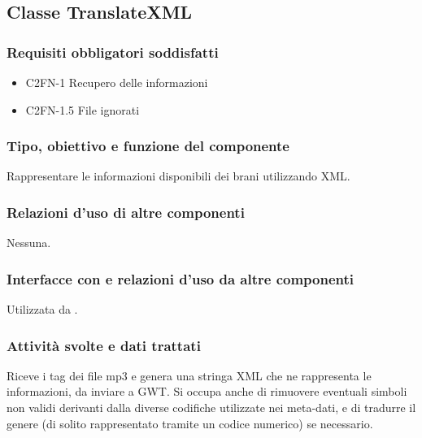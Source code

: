 \subsection{Classe TranslateXML}
\subsubsection*{Requisiti obbligatori soddisfatti}
\begin{itemize}
   \item C2FN-1 Recupero delle informazioni
   \item C2FN-1.5 File ignorati
\end{itemize}

\subsubsection*{Tipo, obiettivo e funzione del componente}
Rappresentare le informazioni disponibili dei brani utilizzando XML.

\subsubsection*{Relazioni d'uso di altre componenti}
Nessuna.

\subsubsection*{Interfacce con e relazioni d'uso da altre componenti}
Utilizzata da .

\subsubsection*{Attivit\`a svolte e dati trattati}
Riceve i tag dei file mp3 e genera una stringa XML che ne rappresenta le
informazioni, da inviare a GWT.
Si occupa anche di rimuovere eventuali simboli non validi derivanti dalla
diverse codifiche utilizzate nei meta-dati, e di tradurre il genere (di solito
rappresentato tramite un codice numerico) se necessario.
\\
\\

